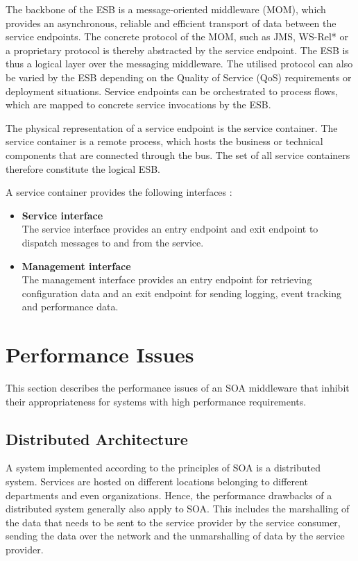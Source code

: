 The backbone of the ESB is a message-oriented middleware (MOM), which provides an asynchronous, reliable and efficient transport of data between the service endpoints. The concrete protocol of the MOM, such as JMS, WS-Rel* or a proprietary protocol is thereby abstracted by the service endpoint. The ESB is thus a logical layer over the messaging middleware. The utilised protocol can also be varied by the ESB depending on the Quality of Service (QoS) requirements or deployment situations. Service endpoints can be orchestrated to process flows, which are mapped to concrete service invocations by the ESB.

The physical representation of a service endpoint is the service container. The service container is a remote process, which hosts the business or technical components that are connected through the bus. The set of all service containers therefore constitute the logical ESB.

A service container provides the following interfaces \citep{Chappell:2004jo}:
\begin{itemize}
	\item \textbf{Service interface}\\
	The service interface provides an entry endpoint and exit endpoint to dispatch messages to and from the service.
	\item \textbf{Management interface}\\
	The management interface provides an entry endpoint for retrieving configuration data and an exit endpoint for sending logging, event tracking and performance data.
\end{itemize}
\section{Performance Issues}
This section describes the performance issues of an SOA middleware that inhibit their appropriateness for systems with high performance requirements.
\subsection{Distributed Architecture}
A system implemented according to the principles of SOA is a distributed system. Services are hosted on different locations belonging to different departments and even organizations. Hence, the performance drawbacks of a distributed system generally also apply to SOA. This includes the marshalling of the data that needs to be sent to the service provider by the service consumer, sending the data over the network and the unmarshalling of data by the service provider.
